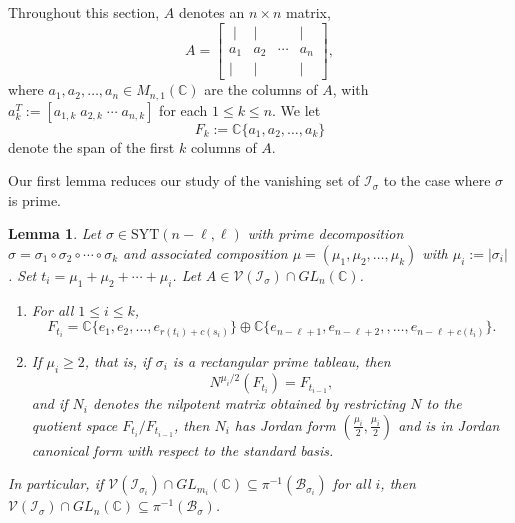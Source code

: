 \documentclass[11pt]{amsart}
\newtheorem{lemma}[theorem]{Lemma}
\theoremstyle{remark}
\theoremstyle{remark}
\theoremstyle{definition}
\theoremstyle{definition}
\theoremstyle{definition}
\numberwithin{equation}{section}
\newcommand{\C}{\mathbb{C}}           %
\newcommand{\gs}{\sigma}
\newcommand{\ci}{\mathcal{I}}
\newcommand{\cv}{\mathcal{V}}
\newcommand{\SYT}{\mathrm{SYT}}
\newcommand{\SF}{\mathcal{B}}
\newcommand{\parsum}{t}
\begin{document}
Throughout this section, $A$ denotes an $n\times n$ matrix,
\[
A = \begin{bmatrix} \; | & | & & | \; \\ a_1 & a_2 & \cdots & a_n \\
| & | & & | \end{bmatrix},
\]
where $a_1, a_2, \ldots, a_n\in M_{n,1}(\C)$ are the columns of $A$, with $a_k^T:= [a_{1,k}\;a_{2,k}\; \cdots\; a_{n,k}]$ for each $1\leq k\leq n$. We let
\[
F_k := \C\{a_1, a_2, \ldots, a_k\}
\]
denote the span of the first $k$ columns of $A$.

Our first lemma reduces our study of the vanishing set of $\ci_\gs$ to the case where $\gs$ is prime. 

\begin{lemma}\label{lem.reduction} Let $\gs\in \SYT(n-\ell,\ell)$ with prime decomposition $\gs = \gs_1\circ \gs_2 \circ \cdots \circ \gs_k$  and associated composition $\mu=(\mu_1, \mu_2, \ldots, \mu_k)$ with $\mu_i := |\gs_i|$. Set $\parsum_i = \mu_1+\mu_2+\cdots +\mu_i$.
Let $A\in \cv(\ci_\gs)\cap GL_n(\C)$. 
\begin{enumerate}
\item For all $1\leq i \leq k$, 
\[
F_{\parsum_i} = \C\{e_1, e_2, \ldots, e_{r(\parsum_i)+c(s_i)}\} \oplus \C\{e_{n-\ell+1}, e_{n-\ell+2},, \ldots, e_{n-\ell+c(\parsum_i)}\}.
\]
\item If $\mu_i\geq 2$, that is, if $\gs_i$ is a rectangular prime tableau, then 
\[
N^{\mu_i/2} (F_{\parsum_i}) = F_{\parsum_{i-1}} ,
\]
and if $N_i$ denotes the nilpotent matrix obtained by restricting $N$ to the quotient space $F_{\parsum_i}/F_{\parsum_{i-1}}$, then $N_i$ has Jordan form $(\frac{\mu_i}{2},\frac{\mu_i}{2})$ and is in Jordan canonical form with respect to the standard basis. 
\end{enumerate}
In particular, if $\cv(\ci_{\gs_i})\cap GL_{m_i}(\C) \subseteq \pi^{-1}(\SF_{\gs_i})$ for all $i$, then $\cv(\ci_\gs)\cap GL_n(\C)\subseteq  \pi^{-1}(\SF_\gs)$. 
\end{lemma}
\end{document}
